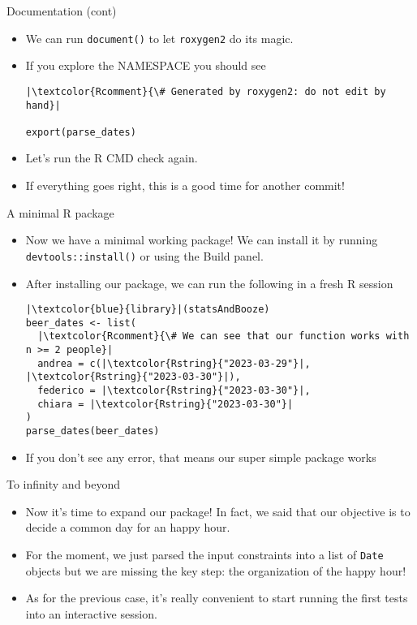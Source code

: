 \documentclass[
hyperref={bookmarks=false},
xcolor={dvipsnames,svgnames*,x11names*}, 
12pt
]{beamer}
\begin{document}
\begin{frame}[fragile]{Documentation (cont)}
\vspace{-0.5cm}
\begin{itemize}
\itemsep 3ex
\item We can run \texttt{document()} to let \texttt{roxygen2} do its magic. 
\item If you explore the NAMESPACE you should see 
\begin{lstlisting}
|\textcolor{Rcomment}{\# Generated by roxygen2: do not edit by hand}|

export(parse_dates)
\end{lstlisting}
\item Let's run the R CMD check again. 
\item If everything goes right, this is a good time for another commit! 
\end{itemize}
\end{frame}

\begin{frame}[fragile]{A minimal R package}
\vspace{-0.5cm}
\begin{itemize}
\itemsep 2ex
\item Now we have a minimal working package! We can install it by running \texttt{devtools::install()} or using the Build panel. 
\item After installing our package, we can run the following in a fresh R session
\begin{lstlisting}
|\textcolor{blue}{library}|(statsAndBooze)
beer_dates <- list(
  |\textcolor{Rcomment}{\# We can see that our function works with n >= 2 people}|
  andrea = c(|\textcolor{Rstring}{"2023-03-29"}|, |\textcolor{Rstring}{"2023-03-30"}|), 
  federico = |\textcolor{Rstring}{"2023-03-30"}|,
  chiara = |\textcolor{Rstring}{"2023-03-30"}|
)
parse_dates(beer_dates)
\end{lstlisting}
\item If you don't see any error, that means our super simple package works 
\end{itemize}
\end{frame}

\begin{frame}[fragile]{To infinity and beyond }
\vspace{-0.5cm}
\begin{itemize}
\itemsep 3ex
\item Now it's time to expand our package! In fact, we said that our objective is to decide a common day for an happy hour. 
\item For the moment, we just parsed the input constraints into a list of \texttt{Date} objects but we are missing the key step: the organization of the happy hour!  
\item As for the previous case, it's really convenient to start running the first tests into an interactive session. 
\end{itemize}
\end{frame}
\end{document}
